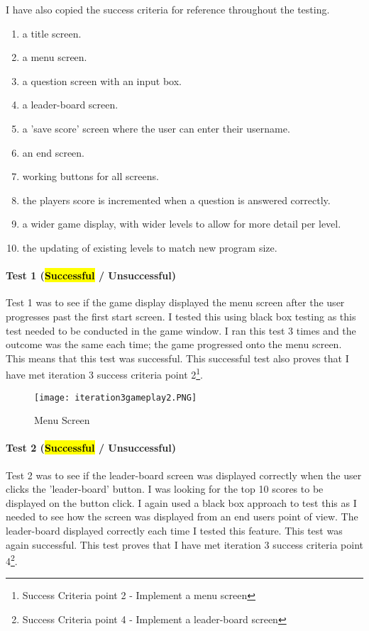 \documentclass[12pt]{report}
\begin{document}
I have also copied the success criteria for reference throughout the testing.

\tiny
\begin{enumerate}
    \item a title screen.
    \item a menu screen. 
    \item a question screen with an input box.
    \item a leader-board screen.
    \item a 'save score' screen where the user can enter their username.
    \item an end screen.
    \item working buttons for all screens.
    \item the players score is incremented when a question is answered correctly.
    \item a wider game display, with wider levels to allow for more detail per level.
    \item the updating of existing levels to match new program size.
\end{enumerate}
\normalsize

\pagebreak

\paragraph{Test 1 (\hl{Successful} / Unsuccessful)}
Test 1 was to see if the game display displayed the menu screen after the user progresses past the first start screen. I tested this using black box testing as this test needed to be conducted in the game window. I ran this test 3 times and the outcome was the same each time; the game progressed onto the menu screen. This means that this test was successful. This successful test also proves that I have met iteration 3 success criteria point 2\footnote{Success Criteria point 2 - Implement a menu screen}.

\begin{figure}[H]
    \centering
    \texttt{[image: iteration3gameplay2.PNG]}
    \caption{Menu Screen}
\end{figure}

\paragraph{Test 2 (\hl{Successful} / Unsuccessful)}
Test 2 was to see if the leader-board screen was displayed correctly when the user clicks the 'leader-board' button. I was looking for the top 10 scores to be displayed on the button click. I again used a black box approach to test this as I needed to see how the screen was displayed from an end users point of view. The leader-board displayed correctly each time I tested this feature. This test was again successful. This test proves that I have met iteration 3 success criteria point 4\footnote{Success Criteria point 4 - Implement a leader-board screen}.
\end{document}
